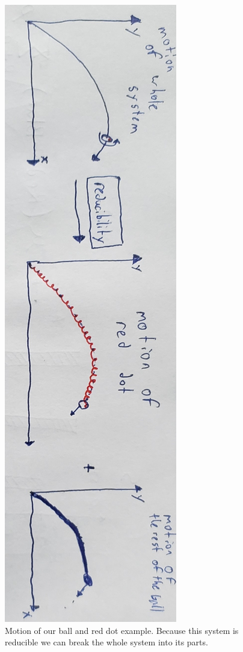 \documentclass{article}
\begin{document}
\begin{figure}[!ht]
\centerline{\includegraphics[width=\linewidth,angle=90,scale=.25]{reddotdiagram.jpg}}
\caption{Motion of our ball and red dot example. Because this system is reducible we can break the whole system into its parts.}
\end{figure}
\end{document}
